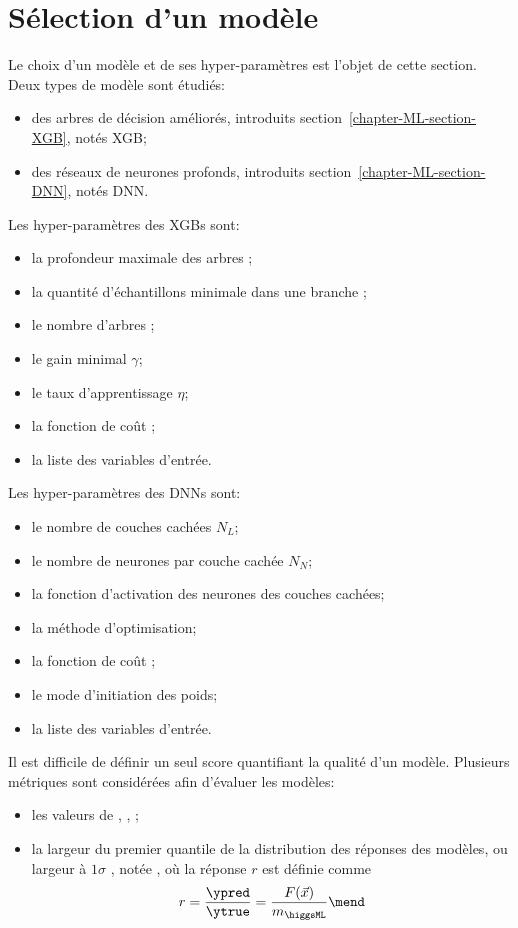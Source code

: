 \section{Sélection d'un modèle}\label{chapter-ML-section-hyperparameters}
Le choix d'un modèle et de ses hyper-paramètres est l'objet de cette section.
Deux types de modèle sont étudiés:
\begin{itemize}
\item des arbres de décision améliorés, introduits section~\ref{chapter-ML-section-XGB}, notés XGB;
\item des réseaux de neurones profonds, introduits section~\ref{chapter-ML-section-DNN}, notés DNN.
\end{itemize}
\par
Les hyper-paramètres des XGBs sont:
\begin{itemize}
\item la profondeur maximale des arbres \MaxDepth;
\item la quantité d'échantillons minimale dans une branche \MinChildWeight;
\item le nombre d'arbres \Nestimators;
\item le gain minimal $\gamma$;
\item le taux d'apprentissage $\eta$;
\item la fonction de coût \Loss;
\item la liste des variables d'entrée.
\end{itemize}
Les hyper-paramètres des DNNs sont:
\begin{itemize}
\item le nombre de couches cachées $N_L$;
\item le nombre de neurones par couche cachée $N_N$;
\item la fonction d'activation des neurones des couches cachées;
\item la méthode d'optimisation;
\item la fonction de coût \Loss;
\item le mode d'initiation des poids;
\item la liste des variables d'entrée.
\end{itemize}
\par
Il est difficile de définir un seul score quantifiant la qualité d'un modèle.
Plusieurs métriques sont considérées afin d'évaluer les modèles:
\begin{itemize}
\item les valeurs de
\LossMSE,
\LossMAE,
\LossMAPE;
\item la largeur du premier quantile de la distribution des réponses des modèles,
ou \og largeur à $1\sigma$ \fg,
notée \OneSigmaWidth,
où la réponse $r$ est définie comme
\begin{equation}
r = \frac{\ypred}{\ytrue} = \frac{F(\vec{x})}{m_{\higgsML}}
\mend
\end{equation}
\end{itemize}
